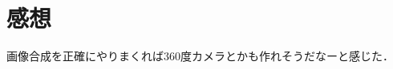 \documentclass[autodetect-engine,dvi=dvipdfmx,ja=standard,
               a4j,11pt]{bxjsarticle}
\begin{document}












\section{感想}

画像合成を正確にやりまくれば360度カメラとかも作れそうだなーと感じた．
\end{document}
